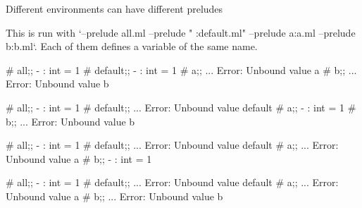 Different environments can have different preludes

This is run with `--prelude all.ml --prelude " :default.ml" --prelude a:a.ml --prelude b:b.ml`.
Each of them defines a variable of the same name.

\begin{ocaml}
# all;;
- : int = 1
# default;;
- : int = 1
# a;;
...
Error: Unbound value a
# b;;
...
Error: Unbound value b
\end{ocaml}

\begin{ocaml}
# all;;
- : int = 1
# default;;
...
Error: Unbound value default
# a;;
- : int = 1
# b;;
...
Error: Unbound value b
\end{ocaml}

\begin{ocaml}
# all;;
- : int = 1
# default;;
...
Error: Unbound value default
# a;;
...
Error: Unbound value a
# b;;
- : int = 1
\end{ocaml}

\begin{ocaml}
# all;;
- : int = 1
# default;;
...
Error: Unbound value default
# a;;
...
Error: Unbound value a
# b;;
...
Error: Unbound value b
\end{ocaml}
